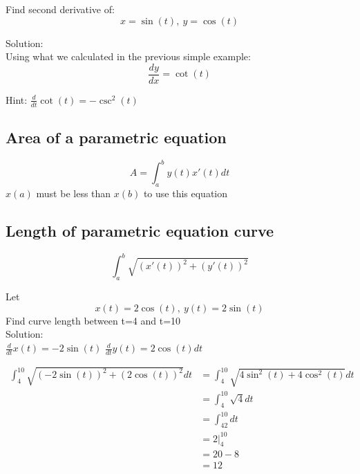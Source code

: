 \begin{simple}{}{}
Find second derivative of:
$$x=\sin{(t)},\ y=\cos{(t)}$$

Solution:\\
Using what we calculated in the previous simple example: $$\dfrac{dy}{dx}=\cot{(t)}$$

Hint: $\frac{d}{dt}\cot{(t)}=-\csc^2{(t)}$
\end{simple}

\subsection{Area of a parametric equation}
    \begin{equation}
        A=\int^b_ay(t)x'(t)dt
    \end{equation}
    $x(a)$ must be less than $x(b)$ to use this equation

\subsection{Length of parametric equation curve}
\begin{equation}
    \int^b_a \sqrt{(x'(t))^2+(y'(t))^2}
\end{equation}

\begin{simple}{}{}
Let 
$$x(t)=2\cos{(t)},\ y(t)=2\sin{(t)}$$
Find curve length between t=4 and t=10\\

Solution:\\
$\frac{d}{dt}x(t)=-2\sin{(t)}$ $\frac{d}{dt}y(t)=2\cos{(t)}dt$

\begin{align*}
    \int^10_4\sqrt{(-2\sin{(t)})^2+(2\cos{(t)})^2}dt&=\int^10_4\sqrt{4\sin^2{(t)}+4\cos^2{(t)}}dt\\
    &=\int^10_4\sqrt{4}dt\\
    &=\int^10_42dt\\
    &=2\left.|^{10}_4\right.\\
    &=20-8\\
    &=12
\end{align*}
\end{simple}
